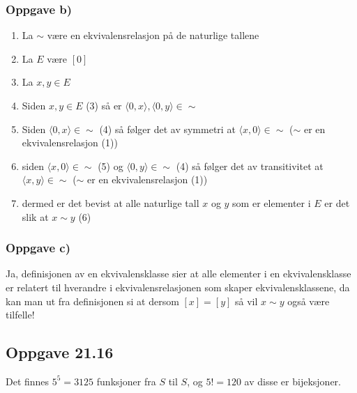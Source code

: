 \documentclass[norsk, 12p]{article}
\begin{document}
\subsubsection{Oppgave b)}
\begin{enumerate} 
    \item La $\sim$ være en ekvivalensrelasjon på de naturlige tallene
    \item La $E$ være $[0]$
    \item La $x, y \in E$
    \item Siden $x, y \in E$ (3) så er $\langle 0,x\rangle ,\langle 0,y\rangle \in \sim$
    \item Siden $\langle 0,x\rangle \in \sim$ (4) så følger det av symmetri at $\langle x,0\rangle \in \sim$ ($\sim$ er en ekvivalensrelasjon (1))
    \item siden $\langle x,0\rangle \in \sim$ (5) og $\langle 0,y\rangle \in \sim$ (4) så følger det av transitivitet at $\langle x,y\rangle \in \sim$ ($\sim$ er en ekvivalensrelasjon (1))
    \item dermed er det bevist at alle naturlige tall $x$ og $y$ som er elementer i $E$ er det slik at $x \sim y$ (6)
\end{enumerate}
\subsubsection{Oppgave c)}
Ja, definisjonen av en ekvivalensklasse sier at alle elementer i en ekvivalensklasse er relatert til hverandre i ekvivalensrelasjonen som skaper ekvivalensklassene, da kan man ut fra definisjonen si at dersom $[x] = [y]$ så vil $x \sim y$ også være tilfelle!

\subsection{Oppgave 21.16}
Det finnes $5^5 = 3125$ funksjoner fra $S$ til $S$, og $5! = 120$ av disse er bijeksjoner.
\end{document}
